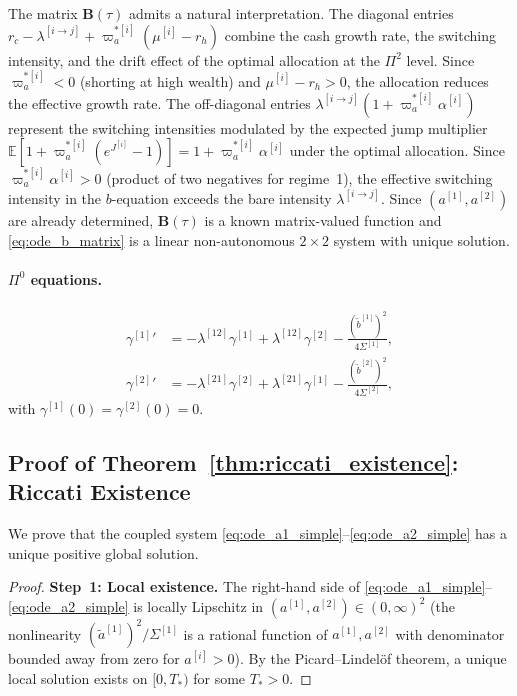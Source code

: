 \documentclass[11pt,a4paper]{article}
\numberwithin{equation}{section}
\newcommand{\E}{\mathbb{E}}
\begin{document}
\begin{appendices}
The matrix $\mathbf{B}(\tau)$ admits a natural interpretation. The diagonal entries $r_c - \lambda^{[i\to j]} + \varpi^{*[i]}_a(\mu^{[i]}-r_h)$ combine the cash growth rate, the switching intensity, and the drift effect of the optimal allocation at the $\Pi^2$ level. Since $\varpi^{*[i]}_a < 0$ (shorting at high wealth) and $\mu^{[i]} - r_h > 0$, the allocation reduces the effective growth rate. The off-diagonal entries $\lambda^{[i\to j]}(1 + \varpi^{*[i]}_a\alpha^{[i]})$ represent the switching intensities modulated by the expected jump multiplier $\E[1 + \varpi^{*[i]}_a(e^{J^{[i]}}-1)] = 1 + \varpi^{*[i]}_a\alpha^{[i]}$ under the optimal allocation. Since $\varpi^{*[i]}_a\alpha^{[i]} > 0$ (product of two negatives for regime~1), the effective switching intensity in the $b$-equation exceeds the bare intensity $\lambda^{[i\to j]}$. Since $(a^{[1]}, a^{[2]})$ are already determined, $\mathbf{B}(\tau)$ is a known matrix-valued function and \eqref{eq:ode_b_matrix} is a linear non-autonomous $2 \times 2$ system with unique solution.

\paragraph{$\Pi^0$ equations.}\label{app:pi0_eqs}
\begin{align}
{\gamma^{[1]}}' &= -\lambda^{[12]}\gamma^{[1]} + \lambda^{[12]}\gamma^{[2]} - \frac{(\tilde{b}^{[1]})^2}{4\Sigma^{[1]}}, \label{eq:ode_g1} \\
{\gamma^{[2]}}' &= -\lambda^{[21]}\gamma^{[2]} + \lambda^{[21]}\gamma^{[1]} - \frac{(\tilde{b}^{[2]})^2}{4\Sigma^{[2]}}, \label{eq:ode_g2}
\end{align}
with $\gamma^{[1]}(0) = \gamma^{[2]}(0) = 0$.


\subsection{Proof of Theorem~\ref{thm:riccati_existence}: Riccati Existence}\label{app:riccati_existence}

We prove that the coupled system \eqref{eq:ode_a1_simple}--\eqref{eq:ode_a2_simple} has a unique positive global solution.

\begin{proof}
\textbf{Step~1: Local existence.} The right-hand side of \eqref{eq:ode_a1_simple}--\eqref{eq:ode_a2_simple} is locally Lipschitz in $(a^{[1]}, a^{[2]}) \in (0,\infty)^2$ (the nonlinearity $(\tilde{a}^{[1]})^2/\Sigma^{[1]}$ is a rational function of $a^{[1]}, a^{[2]}$ with denominator bounded away from zero for $a^{[i]} > 0$). By the Picard--Lindel\"of theorem, a unique local solution exists on $[0, T_*)$ for some $T_* > 0$.


\end{proof}
\end{appendices}
\end{document}
